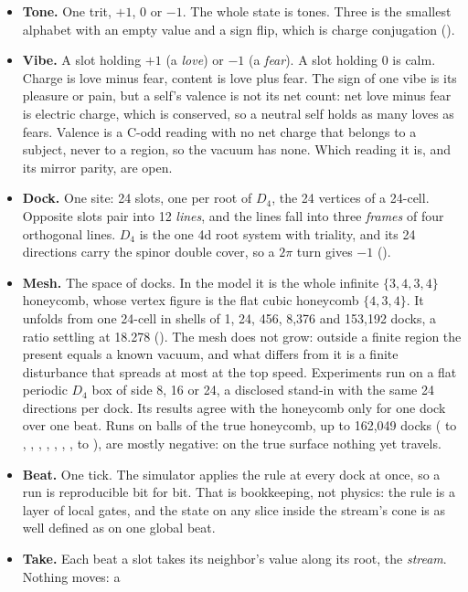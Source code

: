 \begin{itemize}
\item \textbf{Tone.} One trit, $+1$, $0$ or $-1$. The whole state is tones. Three is the smallest alphabet with an
empty value and a sign flip, which is charge conjugation ().
\item \textbf{Vibe.} A slot holding $+1$ (a \emph{love}) or $-1$ (a \emph{fear}). A slot holding 0 is calm. Charge
is love minus fear, content is love plus fear. The sign of one vibe is its pleasure or pain, but a self's valence is
not its net count: net love minus fear is electric charge, which is conserved, so a neutral self holds as many loves
as fears. Valence is a C-odd reading with no net charge that belongs to a subject, never to a region, so the vacuum
has none. Which reading it is, and its mirror parity, are open.
\item \textbf{Dock.} One site: 24 slots, one per root of $D_4$, the 24 vertices of a 24-cell. Opposite slots pair
into 12 \emph{lines}, and the lines fall into three \emph{frames} of four orthogonal lines. $D_4$ is the one 4d
root system with triality, and its 24 directions carry the spinor double cover, so a $2\pi$ turn gives $-1$
().
\item \textbf{Mesh.} The space of docks. In the model it is the whole infinite $\{3,4,3,4\}$ honeycomb, whose vertex
figure is the flat cubic honeycomb $\{4,3,4\}$. It unfolds from one 24-cell in shells of 1, 24, 456, 8,376 and 153,192
docks, a ratio settling at 18.278 (). The mesh does not grow: outside a finite region the present
equals a known vacuum, and what differs from it is a finite disturbance that spreads at most at the top speed.
Experiments run on a flat periodic $D_4$ box of side 8, 16 or 24, a disclosed stand-in with the same 24 directions per
dock. Its results agree with the honeycomb only for one dock over one beat. Runs on balls of the true honeycomb, up to
162,049 docks ( to , , , ,
, , ,  to ), are mostly negative:
on the true surface nothing yet travels.
\item \textbf{Beat.} One tick. The simulator applies the rule at every dock at once, so a run is reproducible bit for
bit. That is bookkeeping, not physics: the rule is a layer of local gates, and the state on any slice inside the
stream's cone is as well defined as on one global beat.
\item \textbf{Take.} Each beat a slot takes its neighbor's value along its root, the \emph{stream}. Nothing moves: a

\end{itemize}
